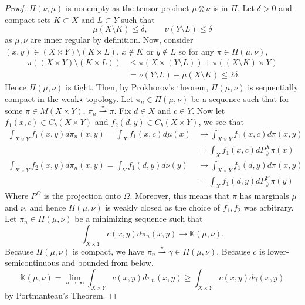 \documentclass[12pt]{article}
\theoremstyle{plain}
\numberwithin{equation}{section}
\begin{document}
\begin{proof}
  $\Pi(\nu,\mu)$ is nonempty as the tensor product $\mu\otimes \nu$ is in $\Pi$. Let $\delta > 0$ and compact sets $K\subset X$ and $L\subset Y$ such that 
  \[\mu(X\setminus K) \le \delta,\qquad \nu(Y\setminus L)\le \delta\]
  as $\mu,\nu$ are inner regular by definition. Now, consider $(x,y)\in (X\times Y)\setminus (K\times L)$. $x\notin K$ or $y\notin L$ so for any $\pi\in\Pi(\mu,\nu)$, 
  \begin{align*}
    \pi((X\times Y)\setminus (K\times L)) &\le \pi(X\times (Y\setminus L)) + \pi((X\setminus K)\times Y) \\
    &= \nu(Y\setminus L) + \mu(X\setminus K) \le 2\delta.
  \end{align*}
  Hence $\Pi(\mu,\nu)$ is tight. Then, by Prokhorov's theorem, $\overline{\Pi(\mu,\nu)}$ is sequentially compact in the weak$\star$ topology.\newline
  Let $\pi_n\in\Pi(\mu,\nu)$ be a sequence such that for some $\pi\in M(X\times Y)$, $\pi_n\overset{\star}{\rightharpoonup} \pi$. Fix $d\in X$ and $c\in Y$. Now let $f_1(x,c) \in C_b(X\times Y)$ and $f_2(d,y)\in C_b(X\times Y)$, we see that 
  \begin{align*}
    \int_{X\times Y} f_1(x,y)d\pi_n(x,y) = \int_{X} f_1(x,c)d\mu(x) &\to \int_{X\times Y} f_1(x,c)d\pi(x,y) \\
    &= \int_{X} f_1(x,c)dP^X_{\#}\pi(x) \\
    \int_{X\times Y} f_2(x,y)d\pi_n(x,y) = \int_{Y} f_1(d,y)d\nu(y) &\to \int_{X\times Y} f_1(d,y)d\pi(x,y) \\
    &= \int_{X} f_1(d,y)dP^Y_{\#}\pi(y)
  \end{align*}
  Where $P^\Omega$ is the projection onto $\Omega$. Moreover, this means that $\pi$ has marginals $\mu$ and $\nu$, and hence $\Pi(\mu,\nu)$ is weakly closed as the choice of $f_1,f_2$ was arbitrary.\newline
  Let $\pi_n\in \Pi(\mu,\nu)$ be a minimizing sequence such that 
  \[\int_{X\times Y}c(x,y)d\pi_n(x,y) \to \mathbb{K}(\mu,\nu).\]
 Because $\Pi(\mu,\nu)$ is compact, we have $\pi_n\overset{\star}{\rightharpoonup}\gamma\in\Pi(\mu,\nu)$. Because $c$ is lower-semicontinuous and bounded from below,
 \begin{equation}
   \mathbb{K}(\mu,\nu) = \lim_{n\to\infty}\int_{X\times Y}c(x,y)d\pi_n(x,y) \ge \int_{X\times Y} c(x,y)d\gamma(x,y)
 \end{equation}
 by Portmanteau's Theorem.
\end{proof}
\end{document}
